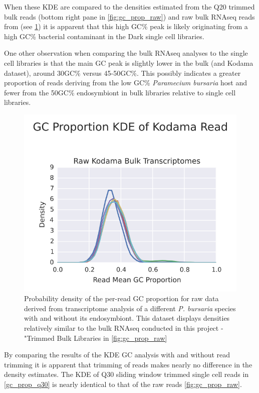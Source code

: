 When these KDE are compared to the densities estimated from the Q20 trimmed
bulk reads (bottom right pane in \ref{fig:gc_prop_raw}) and 
raw bulk RNAseq reads from \citep{Kodama2014} (see \ref{fig:gc_prop_kodama}) 
it is apparent that this high GC\% peak is likely originating from
a high GC\% bacterial contaminant in the Dark single cell libraries.  

One other observation when comparing the bulk RNAseq analyses to the single cell
libraries is that the main GC peak is slightly lower in the bulk (and Kodama dataset), 
around 30GC\% versus 45-50GC\%.
This possibly indicates a greater proportion of reads deriving from the low
GC\% \textit{Paramecium bursaria} host and fewer from the 50GC\% endosymbiont
in bulk libraries relative to single cell libraries.  

\begin{figure}[h]
    \includegraphics[width=\textwidth]{kodama_gc_prop.svg}
    \caption{Probability density of the per-read GC proportion for raw data derived from
    \citep{Kodama2014} transcriptome analysis of a different \textit{P. bursaria} species
with and without its endosymbiont. This dataset displays densities relatively similar
to the bulk RNAseq conducted in this project - "Trimmed Bulk Libraries in \ref{fig:gc_prop_raw}}
    \label{fig:gc_prop_kodama}
\end{figure}

By comparing the results of the KDE GC analysis with and without read trimming it
is apparent that trimming of reads makes nearly no difference in the density estimates.
The KDE of Q30 sliding window trimmed single cell reads in \ref{gc_prop_q30} is nearly
identical to that of the raw reads \ref{fig:gc_prop_raw}.

